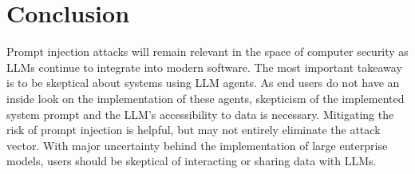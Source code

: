 \documentclass[11pt]{article}
\begin{document}
\section{Conclusion}
Prompt injection attacks will remain relevant in the space of computer security as LLMs continue to integrate into modern software. The most important takeaway is to be skeptical about systems using LLM agents. As end users do not have an inside look on the implementation of these agents, skepticism of the implemented system prompt and the LLM's accessibility to data is necessary. Mitigating the risk of prompt injection is helpful, but may not entirely eliminate the attack vector. With major uncertainty behind the implementation of large enterprise models, users should be skeptical of interacting or sharing data with LLMs.
\end{document}
